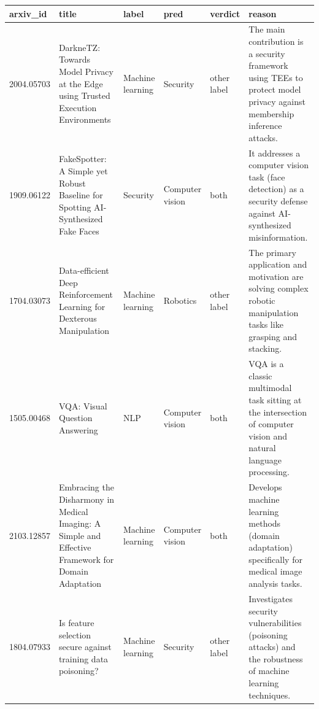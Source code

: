 \begin{tabular}{llllll}
\toprule
arxiv\_id & title & label & pred & verdict & reason \\
\midrule
2004.05703 & DarkneTZ: Towards Model Privacy at the Edge using Trusted Execution Environments & Machine learning & Security & other label & The main contribution is a security framework using TEEs to protect model privacy against membership inference attacks. \\
1909.06122 & FakeSpotter: A Simple yet Robust Baseline for Spotting AI-Synthesized Fake Faces & Security & Computer vision & both & It addresses a computer vision task (face detection) as a security defense against AI-synthesized misinformation. \\
1704.03073 & Data-efficient Deep Reinforcement Learning for Dexterous Manipulation & Machine learning & Robotics & other label & The primary application and motivation are solving complex robotic manipulation tasks like grasping and stacking. \\
1505.00468 & VQA: Visual Question Answering & NLP & Computer vision & both & VQA is a classic multimodal task sitting at the intersection of computer vision and natural language processing. \\
2103.12857 & Embracing the Disharmony in Medical Imaging: A Simple and Effective Framework for Domain Adaptation & Machine learning & Computer vision & both & Develops machine learning methods (domain adaptation) specifically for medical image analysis tasks. \\
1804.07933 & Is feature selection secure against training data poisoning? & Machine learning & Security & other label & Investigates security vulnerabilities (poisoning attacks) and the robustness of machine learning techniques. \\
\bottomrule
\end{tabular}
